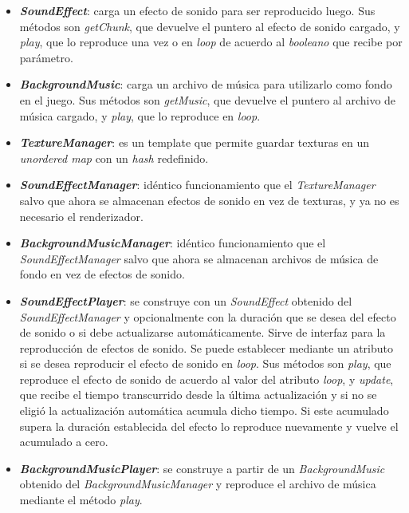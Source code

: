 \begin{itemize}
	\item \textbf{\textit{SoundEffect}}: carga un efecto de sonido para ser reproducido luego. Sus métodos son \textit{getChunk}, que devuelve el puntero al efecto de sonido cargado, y \textit{play}, que lo reproduce una vez o en \textit{loop} de acuerdo al \textit{booleano} que recibe por parámetro.

	\item \textbf{\textit{BackgroundMusic}}: carga un archivo de música para utilizarlo como fondo en el juego. Sus métodos son \textit{getMusic}, que devuelve el puntero al archivo de música cargado, y \textit{play}, que lo reproduce en \textit{loop}.

	\item \textbf{\textit{TextureManager}}: es un template que permite guardar texturas en un \textit{unordered map} con un \textit{hash} redefinido.

	\item \textbf{\textit{SoundEffectManager}}: idéntico funcionamiento que el \textit{TextureManager} salvo que ahora se almacenan efectos de sonido en vez de texturas, y ya no es necesario el renderizador.

	\item \textbf{\textit{BackgroundMusicManager}}: idéntico funcionamiento que el \textit{SoundEffectManager} salvo que ahora se almacenan archivos de música de fondo en vez de efectos de sonido.

	\item \textbf{\textit{SoundEffectPlayer}}: se construye con un \textit{SoundEffect} obtenido del \textit{SoundEffectManager} y opcionalmente con la duración que se desea del efecto de sonido o si debe actualizarse automáticamente. Sirve de interfaz para la reproducción de efectos de sonido. Se puede establecer mediante un atributo si se desea reproducir el efecto de sonido en \textit{loop}. Sus métodos son \textit{play}, que reproduce el efecto de sonido de acuerdo al valor del atributo \textit{loop}, y \textit{update}, que recibe el tiempo transcurrido desde la última actualización y si no se eligió la actualización automática acumula dicho tiempo. Si este acumulado supera la duración establecida del efecto lo reproduce nuevamente y vuelve el acumulado a cero.

	\item \textbf{\textit{BackgroundMusicPlayer}}: se construye a partir de un \textit{BackgroundMusic} obtenido del \textit{BackgroundMusicManager} y reproduce el archivo de música mediante el método \textit{play}.


\end{itemize}
